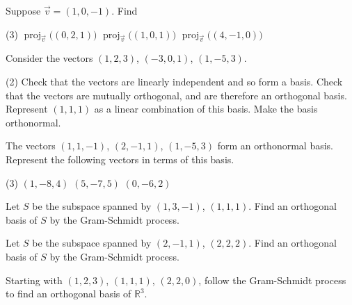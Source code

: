 \documentclass{ximera}
\begin{document}
\begin{exercise}
    Suppose $\vec{v} = (1,0,-1)$.  Find
    \begin{tasks}(3)
        \task $\operatorname{proj}_{\vec{v}}\bigl( (0,2,1) \bigr)$
        \task $\operatorname{proj}_{\vec{v}}\bigl( (1,0,1) \bigr)$
        \task $\operatorname{proj}_{\vec{v}}\bigl( (4,-1,0) \bigr)$
    \end{tasks}
\end{exercise}

\begin{exercise}
    Consider the vectors $(1,2,3)$, $(-3,0,1)$, $(1,-5,3)$.
    \begin{tasks}(2)
        \task Check that the vectors are linearly independent and so form a basis.
        \task Check that the vectors are mutually orthogonal, and are therefore an orthogonal basis.
        \task Represent $(1,1,1)$ as a linear combination of this basis.
        \task Make the basis orthonormal.
    \end{tasks}
\end{exercise}


\begin{exercise}
    The vectors $(1,1,-1)$, $(2,-1,1)$, $(1,-5,3)$ form an orthonormal basis. Represent the following vectors in terms of this basis.
    \begin{tasks}(3)
        \task $(1,-8,4)$
        \task $(5,-7,5)$
        \task $(0,-6,2)$
    \end{tasks}
\end{exercise}

\begin{exercise}
    Let $S$ be the subspace spanned by $(1,3,-1)$, $(1,1,1)$.  Find an orthogonal basis of $S$ by the Gram-Schmidt process.
\end{exercise}

\begin{exercise}%
    Let $S$ be the subspace spanned by $(2,-1,1)$, $(2,2,2)$.  Find an orthogonal basis of $S$ by the Gram-Schmidt process.
\end{exercise}

\begin{exercise}
    Starting with $(1,2,3)$, $(1,1,1)$, $(2,2,0)$, follow the Gram-Schmidt process to find an orthogonal basis of ${\mathbb{R}}^3$.
\end{exercise}
\end{document}
